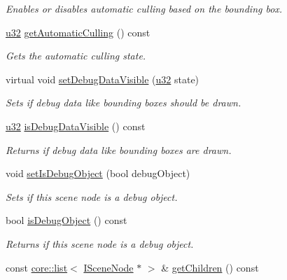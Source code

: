 \begin{DoxyCompactItemize}
\begin{DoxyCompactList}\small\item\em Enables or disables automatic culling based on the bounding box. \end{DoxyCompactList}\item 
\hyperlink{namespaceirr_a0416a53257075833e7002efd0a18e804}{u32} \hyperlink{classirr_1_1scene_1_1ISceneNode_a0748cd5c678e41a4fcff0514937c77be}{get\+Automatic\+Culling} () const
\begin{DoxyCompactList}\small\item\em Gets the automatic culling state. \end{DoxyCompactList}\item 
virtual void \hyperlink{classirr_1_1scene_1_1ISceneNode_ad83877ca84fa9cde95f099f961e80577}{set\+Debug\+Data\+Visible} (\hyperlink{namespaceirr_a0416a53257075833e7002efd0a18e804}{u32} state)
\begin{DoxyCompactList}\small\item\em Sets if debug data like bounding boxes should be drawn. \end{DoxyCompactList}\item 
\hyperlink{namespaceirr_a0416a53257075833e7002efd0a18e804}{u32} \hyperlink{classirr_1_1scene_1_1ISceneNode_ad35515d81242e24c8b831bf29a555221}{is\+Debug\+Data\+Visible} () const
\begin{DoxyCompactList}\small\item\em Returns if debug data like bounding boxes are drawn. \end{DoxyCompactList}\item 
void \hyperlink{classirr_1_1scene_1_1ISceneNode_a7ceda3eb747a353ffeda02c26e697cbd}{set\+Is\+Debug\+Object} (bool debug\+Object)
\begin{DoxyCompactList}\small\item\em Sets if this scene node is a debug object. \end{DoxyCompactList}\item 
bool \hyperlink{classirr_1_1scene_1_1ISceneNode_a304529a50ee58361a84d1db012bbc476}{is\+Debug\+Object} () const
\begin{DoxyCompactList}\small\item\em Returns if this scene node is a debug object. \end{DoxyCompactList}\item 
const \hyperlink{classirr_1_1core_1_1list}{core\+::list}$<$ \hyperlink{classirr_1_1scene_1_1ISceneNode}{I\+Scene\+Node} $\ast$ $>$ \& \hyperlink{classirr_1_1scene_1_1ISceneNode_a9a0e01ebfbf9f05e0caa147b290ffaf5}{get\+Children} () const

\end{DoxyCompactItemize}
